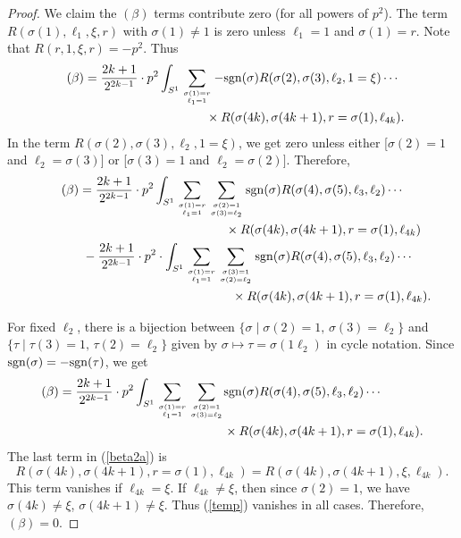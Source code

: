 \documentclass[10pt,a4paper]{amsart}
\numberwithin{equation}{section}
\theoremstyle{definition}
\newcommand{\bxi}{\xi}
\newcommand{\br}{ R}
\newcommand{\sgn}{{\rm sgn}}
\newcommand{\ints}{\int_{S^1}}
\begin{document}
\begin{proof}
We claim the $(\beta)$ terms contribute zero \big(for all powers of $p^2$\big). The term
$ \br(\sigma(1), \ell_1,\bxi,r)$ with $\sigma(1)\neq 1$ is zero unless $\ell_1 = 1$ and $\sigma(1) = r$. Note that $\br(r, 1, \bxi, r) = -p^2$. Thus
\begin{gather*}
(\beta)=\frac{2k+1}{2^{2k-1}}\cdot p^2\ints \sum_{\sigma(1) = r\atop \ell_1 = 1} -\sgn(\sigma)
\br(\sigma(2), \sigma(3), \ell_2, 1 = \bxi)\cdots\\
\hphantom{(\beta)=\frac{2k+1}{2^{2k-1}}\cdot p^2\ints \sum_{\sigma(1) = r\atop \ell_1 = 1} }{} \times
 \br(\sigma(4k),\sigma(4k+1), r = \sigma(1), \ell_{4k}).\nonumber
 \end{gather*}
In the term $\br(\sigma(2), \sigma(3), \ell_2, 1 = \bxi)$, we
get zero unless either [$\sigma(2) = 1$ and $\ell_2 = \sigma(3)$] or [$\sigma(3) = 1$
and $\ell_2 = \sigma(2)]$. Therefore,
\begin{gather*}
(\beta)
=\frac{2k+1}{2^{2k-1}}\cdot p^2
\ints \sum_{\sigma(1) = r\atop \ell_1 = 1}\sum_{\sigma(2) = 1\atop \sigma(3) = \ell_2}\sgn(\sigma)
\br(\sigma(4), \sigma(5), \ell_3, \ell_2)\cdots \\
\hphantom{(\beta)=\frac{2k+1}{2^{2k-1}}\cdot p^2
\ints \sum_{\sigma(1) = r\atop \ell_1 = 1}\sum_{\sigma(2) = 1\atop \sigma(3) = \ell_2}}{}
\times
 \br(\sigma(4k),\sigma(4k+1), r = \sigma(1), \ell_{4k})\\
\hphantom{(\beta)=}{} - \frac{2k+1}{2^{2k-1}}\cdot p^2
\cdot \ints\sum_{\sigma(1) = r\atop \ell_1 = 1}\sum_{\sigma(3) = 1\atop \sigma(2) = \ell_2}\sgn(\sigma)
\br(\sigma(4), \sigma(5), \ell_3, \ell_2)\cdots\\
\hphantom{(\beta)=- \frac{2k+1}{2^{2k-1}}\cdot p^2\cdot \ints\sum_{\sigma(1) = r\atop \ell_1 = 1}\sum_{\sigma(3) = 1\atop \sigma(2) = \ell_2}}{}
\times
 \br(\sigma(4k),\sigma(4k+1), r = \sigma(1), \ell_{4k}).
 \end{gather*}

For fixed $\ell_2$, there is a bijection between $\{\sigma \mid \sigma(2) = 1,\, \sigma(3) = \ell_2\}$
and
$\{\tau\mid \tau(3) = 1,\, \tau(2) = \ell_2\}$ given by $\sigma\mapsto \tau =\sigma(1\ell_2)$ in cycle notation. Since $\sgn(\sigma) = -\sgn(\tau)$, we get
\begin{align}\nonumber
(\beta)
=\frac{2k+1}{2^{2k-1}}\cdot p^2
\ints \sum_{\sigma(1) = r\atop \ell_1 = 1}\sum_{\sigma(2) = 1\atop \sigma(3) = \ell_2}&\sgn(\sigma)
\br(\sigma(4), \sigma(5), \ell_3, \ell_2)\cdots\\
&\times
 \br(\sigma(4k),\sigma(4k+1), r = \sigma(1), \ell_{4k}).\label{beta2a}
 \end{align}
The last term in (\ref{beta2a}) is
\begin{equation}\label{temp}\br(\sigma(4k),\sigma(4k+1), r = \sigma(1), \ell_{4k}) =
\br(\sigma(4k),\sigma(4k+1), \bxi, \ell_{4k}).
\end{equation}
This term vanishes if $\ell_{4k} = \bxi$. If $\ell_{4k}\neq \bxi$, then since $\sigma(2) = 1$, we have $\sigma(4k)\neq \bxi$, ${\sigma(4k+1)\neq \bxi}$. Thus (\ref{temp}) vanishes in all cases.
Therefore, $(\beta) = 0$.


\end{proof}
\end{document}

